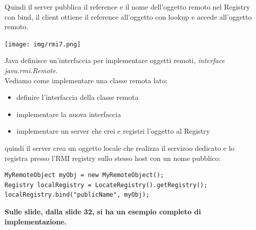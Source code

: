 \documentclass[a4paper,12pt, oneside]{book}
\begin{document}
Quindi il server pubblica il reference e il nome dell’oggetto remoto
nel Registry con bind, il client ottiene il reference all’oggetto con lookup e accede all'oggetto remoto.
\begin{center}
\texttt{[image: img/rmi7.png]}
\end{center}
Java definisce un’interfaccia per implementare oggetti remoti, \textit{interface java.rmi.Remote}.\\
Vediamo come implementare una classe remota lato:
\begin{itemize}
\item definire l'interfaccia della classe remota
\item implementare la nuova interfaccia
\item implementare un server che crei e registri l’oggetto al Registry
\end{itemize}
quindi il server crea un oggetto locale che realizza il servizoo dedicato e lo registra presso l'RMI registry sullo stesso host con un nome pubblico:
\begin{verbatim}
MyRemoteObject myObj = new MyRemoteObject();
Registry localRegistry = LocateRegistry().getRegistry();
localRegistry.bind("publicName", myObj);
\end{verbatim}
\textbf{Sulle slide, dalla slide 32, si ha un esempio completo di implementazione.}\\
\end{document}
